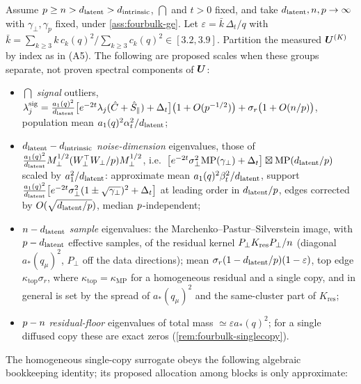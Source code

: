 \begin{remark}\label{prop:fourbulk}
Assume $p\ge n>d_{\mathrm{latent}}>d_{\mathrm{intrinsic}}$, $\dint$ and $t>0$ fixed, and take $d_{\mathrm{latent}},n,p\to\infty$ with $\gamma_\perp,\gamma_p$ fixed, under \cref{ass:fourbulk-ge}. Let $\varepsilon=\bar k\,\Delta_t/q$ with $\bar k=\sum_{k\ge3}k\,c_k(q)^2/\sum_{k\ge3}c_k(q)^2\in[3.2,3.9]$. Partition the measured $\bm{U}^{(K)}$ by index as in (A5). The following are proposed scales when these groups separate, not proven spectral components of $\bm{U}$:
\begin{itemize}
\item[(i)] $\dint$ \emph{signal} outliers, $\lambda^{\mathrm{sig}}_j=\tfrac{a_1(q)^2}{d_{\mathrm{latent}}}\bigl[e^{-2t}\lambda_j(\hat C+\hat S_\parallel)+\Delta_t\bigr]\bigl(1+O(p^{-1/2})\bigr)+\sigma_r\bigl(1+O(n/p)\bigr)$, population mean $a_1(q)^2\alpha_t^2/d_{\mathrm{latent}}$;
\item[(ii)] $d_{\mathrm{latent}}-d_{\mathrm{intrinsic}}$ \emph{noise-dimension} eigenvalues, those of $\tfrac{a_1(q)^2}{d_{\mathrm{latent}}}M_\perp^{1/2}(W_\perp^\top W_\perp/p)M_\perp^{1/2}$, i.e.\ $\bigl[e^{-2t}\sigma_{\perp}^2\mathrm{MP}(\gamma_\perp)+\Delta_t\bigr]\boxtimes\mathrm{MP}(d_{\mathrm{latent}}/p)$ scaled by $a_1^2/d_{\mathrm{latent}}$: approximate mean $a_1(q)^2\beta_t^2/d_{\mathrm{latent}}$, support $\tfrac{a_1(q)^2}{d_{\mathrm{latent}}}\bigl[e^{-2t}\sigma_{\perp}^2(1\pm\sqrt{\gamma_\perp})^2+\Delta_t\bigr]$ at leading order in $d_{\mathrm{latent}}/p$, edges corrected by $O(\sqrt{d_{\mathrm{latent}}/p})$, median $p$-independent;
\item[(iii)] $n-d_{\mathrm{latent}}$ \emph{sample} eigenvalues: the Marchenko--Pastur--Silverstein image, with $p-d_{\mathrm{latent}}$ effective samples, of the residual kernel $P_\perp K_{\mathrm{res}}P_\perp/n$ (diagonal $a_*(q_\mu)^2$, $P_\perp$ off the data directions); mean $\sigma_r(1-d_{\mathrm{latent}}/p)(1-\varepsilon)$, top edge $\kappa_{\mathrm{top}}\sigma_r$, where $\kappa_{\mathrm{top}}=\kappa_{\mathrm{MP}}$ for a homogeneous residual and a single copy, and in general is set by the spread of $a_*(q_\mu)^2$ and the same-cluster part of $K_{\mathrm{res}}$;
\item[(iv)] $p-n$ \emph{residual-floor} eigenvalues of total mass $\simeq\varepsilon a_*(q)^2$; for a single diffused copy these are exact zeros (\cref{rem:fourbulk-singlecopy}).
\end{itemize}
The homogeneous single-copy surrogate obeys the following algebraic bookkeeping identity; its proposed allocation among blocks is only approximate:
\begin{equation}\label{eq:fourbulk-trace}

\end{equation}
\end{remark}
